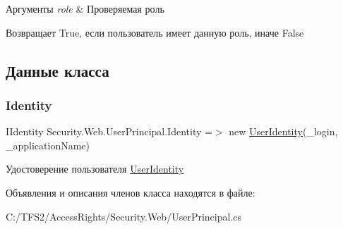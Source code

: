\begin{DoxyParams}{Аргументы}
{\em role} & Проверяемая роль\\
\hline
\end{DoxyParams}
\begin{DoxyReturn}{Возвращает}
True, если пользователь имеет данную роль, иначе False
\end{DoxyReturn}


\subsection{Данные класса}
\mbox{\label{class_security_1_1_web_1_1_user_principal_aff69e614d55b6ae2497d8c9e42b08557}} 
\subsubsection{\texorpdfstring{Identity}{Identity}}
{\footnotesize\ttfamily I\+Identity Security.\+Web.\+User\+Principal.\+Identity =$>$ new \hyperlink{class_security_1_1_web_1_1_user_identity}{User\+Identity}(\+\_\+login, \+\_\+application\+Name)}



Удостоверение пользователя \hyperlink{class_security_1_1_web_1_1_user_identity}{User\+Identity} 



Объявления и описания членов класса находятся в файле\+:\begin{DoxyCompactItemize}
\item 
C\+:/\+T\+F\+S2/\+Access\+Rights/\+Security.\+Web/User\+Principal.\+cs\end{DoxyCompactItemize}
